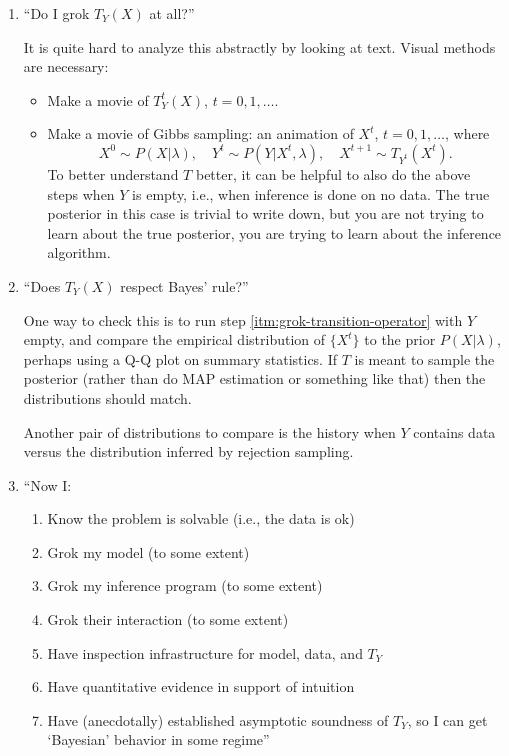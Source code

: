 \documentclass[11pt]{article}
\begin{document}
\begin{enumerate}
  \item\label{itm:grok-transition-operator}
    ``Do I grok $T_Y(X)$ at all?''

    It is quite hard to analyze this abstractly by looking at text.  Visual
    methods are necessary:
    \begin{itemize}[noitemsep]
      \item Make a movie of $T_Y^t(X)$, $t=0,1,\ldots$.
      \item Make a movie of Gibbs sampling: an animation of $X^t$, $t=0,1,\ldots$, where
        \[
        X^0 \sim P(X|\lambda), \quad
        Y^t \sim P(Y|X^t,\lambda), \quad
        X^{t+1} \sim T_{Y^t}(X^t).
        \]
        To better understand $T$ better, it can be helpful to also do the above
        steps when $Y$ is empty, i.e., when inference is done on no data.  The
        true posterior in this case is trivial to write down, but you are not
        trying to learn about the true posterior, you are trying to learn about
        the inference algorithm.
    \end{itemize}

  \item ``Does $T_Y(X)$ respect Bayes' rule?''

    One way to check this is to run step \ref{itm:grok-transition-operator} with
    $Y$ empty, and compare the empirical distribution of $\{X^t\}$ to the prior
    $P(X|\lambda)$, perhaps using a Q-Q plot on summary statistics.  If $T$ is
    meant to sample the posterior (rather than do MAP estimation or something
    like that) then the distributions should match.

    Another pair of distributions to compare is the history when $Y$ contains
    data versus the distribution inferred by rejection sampling.

  \item ``Now I:
    \begin{enumerate}
      \item Know the problem is solvable (i.e., the data is ok)
      \item Grok my model (to some extent)
      \item Grok my inference program (to some extent)
      \item Grok their interaction (to some extent)
      \item Have inspection infrastructure for model, data, and $T_Y$
      \item Have quantitative evidence in support of intuition
      \item Have (anecdotally) established asymptotic soundness of $T_Y$, so I
        can get `Bayesian' behavior in some regime''
    \end{enumerate}


\end{enumerate}
\end{document}
